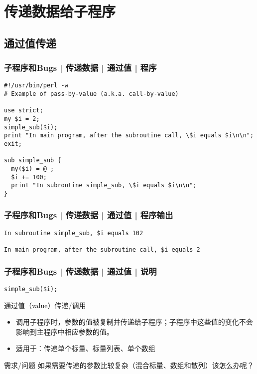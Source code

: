 \section{传递数据给子程序}
\subsection{通过值传递}
\begin{frame}[fragile]
  \frametitle{子程序和Bugs | 传递数据 | 通过值 | 程序}
\begin{lstlisting}[basicstyle=\small\tt]
#!/usr/bin/perl -w
# Example of pass-by-value (a.k.a. call-by-value)

use strict;
my $i = 2;
simple_sub($i);
print "In main program, after the subroutine call, \$i equals $i\n\n";
exit;

sub simple_sub {
  my($i) = @_;
  $i += 100;
  print "In subroutine simple_sub, \$i equals $i\n\n";
}
\end{lstlisting}
\end{frame}

\begin{frame}[fragile]
  \frametitle{子程序和Bugs | 传递数据 | 通过值 | 程序输出}
\begin{lstlisting}
In subroutine simple_sub, $i equals 102

In main program, after the subroutine call, $i equals 2
\end{lstlisting}
\end{frame}

\begin{frame}[fragile]
  \frametitle{子程序和Bugs | 传递数据 | 通过值 | \alert{说明}}
\begin{lstlisting}
simple_sub($i);
\end{lstlisting}
\begin{block}{通过值（value）传递/调用}
  \begin{itemize}
    \item 调用子程序时，参数的值被复制并传递给子程序；子程序中这些值的变化不会影响到主程序中相应参数的值。
    \item 适用于：传递单个标量、标量列表、单个数组
  \end{itemize}
\end{block}
\pause
\begin{block}{需求/问题}
  如果需要传递的参数比较复杂（混合标量、数组和散列）该怎么办呢？
\end{block}
\end{frame}

